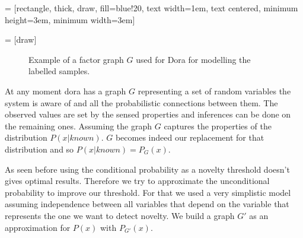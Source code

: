 \documentclass[a4paper]{article}
\begin{document}
 = [rectangle,
                      thick,
                      draw, fill=blue!20,
                      text width=1em,
                      text centered,
                      minimum height=3em,
                      minimum width=3em]

 = [draw]

\begin{figure}[h]
\centering
{}
\caption{Example of a factor graph $G$ used for Dora for modelling the labelled samples.}
\end{figure}


At any moment dora has a graph $G$ representing a set of random variables the system is aware of and all the probabilistic connections between them.
The observed values are set by the sensed properties and inferences can be done on the remaining ones.
Assuming the graph $G$ captures the properties of the distribution $P(x|known)$. $G$ becomes indeed our replacement for that distribution and so $P(x|known) = P_G(x)$.

As seen before using the conditional probability as a novelty threshold doesn't gives optimal results. Therefore we try to approximate the unconditional probability to improve our threshold.
For that we used a very simplistic model assuming independence between all variables that depend on the variable that represents the one we want to detect novelty.
We build a graph $G'$ as an approximation for $P(x)$ with $P_{G'}(x)$.
\end{document}
